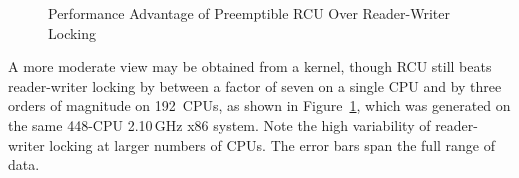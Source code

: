 \begin{figure}[tb]
\centering
{}
\caption{Performance Advantage of Preemptible RCU Over Reader-Writer Locking}
\label{fig:defer:Performance Advantage of Preemptible RCU Over Reader-Writer Locking}
\end{figure}

A more moderate view may be obtained from a  kernel,
though RCU still beats reader-writer locking by between a factor of seven
on a single CPU and by three orders of magnitude on 192~CPUs, as shown in
Figure~\ref{fig:defer:Performance Advantage of Preemptible RCU Over Reader-Writer Locking},
which was generated on the same 448-CPU 2.10\,GHz x86 system.
Note the high variability of reader-writer locking at larger numbers of CPUs.
The error bars span the full range of data.

\QuickQuizEnd

